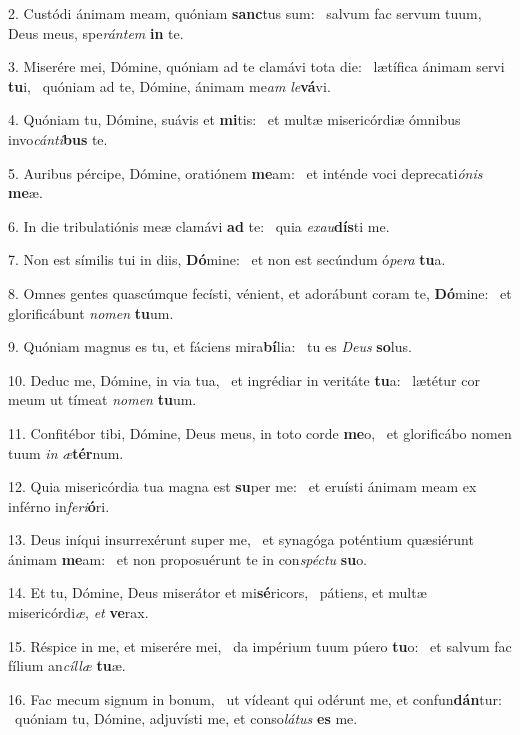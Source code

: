 2. Custódi ánimam meam, quóniam \textbf{sanc}tus sum: \ast\  salvum fac servum tuum, Deus meus, spe\textit{rán}\textit{tem} \textbf{in} te.\

3. Miserére mei, Dómine, quóniam ad te clamávi tota die: \dag\  lætífica ánimam servi \textbf{tu}i, \ast\  quóniam ad te, Dómine, ánimam me\textit{am} \textit{le}\textbf{vá}vi.\

4. Quóniam tu, Dómine, suávis et \textbf{mi}tis: \ast\  et multæ misericórdiæ ómnibus invo\textit{cán}\textit{ti}\textbf{bus} te.\

5. Auribus pércipe, Dómine, oratiónem \textbf{me}am: \ast\  et inténde voci deprecati\textit{ó}\textit{nis} \textbf{me}æ.\

6. In die tribulatiónis meæ clamávi \textbf{ad} te: \ast\  quia \textit{ex}\textit{au}\textbf{dís}ti me.\

7. Non est símilis tui in diis, \textbf{Dó}mine: \ast\  et non est secúndum ó\textit{pe}\textit{ra} \textbf{tu}a.\

8. Omnes gentes quascúmque fecísti, vénient, et adorábunt coram te, \textbf{Dó}mine: \ast\  et glorificábunt \textit{no}\textit{men} \textbf{tu}um.\

9. Quóniam magnus es tu, et fáciens mira\textbf{bí}lia: \ast\  tu es \textit{De}\textit{us} \textbf{so}lus.\

10. Deduc me, Dómine, in via tua, \dag\  et ingrédiar in veritáte \textbf{tu}a: \ast\  lætétur cor meum ut tímeat \textit{no}\textit{men} \textbf{tu}um.\

11. Confitébor tibi, Dómine, Deus meus, in toto corde \textbf{me}o, \ast\  et glorificábo nomen tuum \textit{in} \textit{æ}\textbf{tér}num.\

12. Quia misericórdia tua magna est \textbf{su}per me: \ast\  et eruísti ánimam meam ex inférno in\textit{fe}\textit{ri}\textbf{ó}ri.\

13. Deus iníqui insurrexérunt super me, \dag\  et synagóga poténtium quæsiérunt ánimam \textbf{me}am: \ast\  et non proposuérunt te in con\textit{spéc}\textit{tu} \textbf{su}o.\

14. Et tu, Dómine, Deus miserátor et mi\textbf{sé}ricors, \ast\  pátiens, et multæ misericórdi\textit{æ}, \textit{et} \textbf{ve}rax.\

15. Réspice in me, et miserére mei, \dag\  da impérium tuum púero \textbf{tu}o: \ast\  et salvum fac fílium an\textit{cíl}\textit{læ} \textbf{tu}æ.\

16. Fac mecum signum in bonum, \dag\  ut vídeant qui odérunt me, et confun\textbf{dán}tur: \ast\  quóniam tu, Dómine, adjuvísti me, et conso\textit{lá}\textit{tus} \textbf{es} me.\

